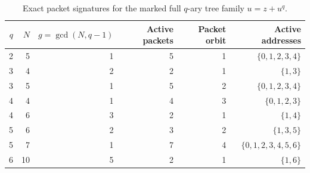 \begin{table}[htbp]
\centering
\caption{Exact packet signatures for the marked full $q$-ary tree family $u=z+u^q$.}
\label{tab:block11-qary-phases}
\small
\begin{tabular}{rrrrrr}
\toprule
$q$ & $N$ & $g=\gcd(N,q-1)$ & Active packets & Packet orbit & Active addresses\\
\midrule
2 & 5 & 1 & 5 & 1 & $\{0,1,2,3,4\}$\\
3 & 4 & 2 & 2 & 1 & $\{1,3\}$\\
3 & 5 & 1 & 5 & 2 & $\{0,1,2,3,4\}$\\
4 & 4 & 1 & 4 & 3 & $\{0,1,2,3\}$\\
4 & 6 & 3 & 2 & 1 & $\{1,4\}$\\
5 & 6 & 2 & 3 & 2 & $\{1,3,5\}$\\
5 & 7 & 1 & 7 & 4 & $\{0,1,2,3,4,5,6\}$\\
6 & 10 & 5 & 2 & 1 & $\{1,6\}$\\
\bottomrule
\end{tabular}
\end{table}
